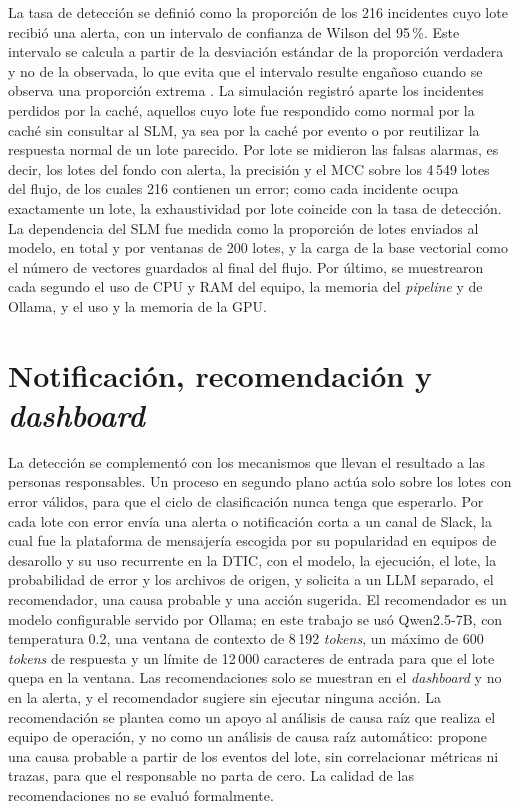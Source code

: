 La tasa de detección se definió como la proporción de los 216 incidentes cuyo lote recibió una alerta, con un intervalo de confianza de Wilson del 95\,\%. Este intervalo se calcula a partir de la desviación estándar de la proporción verdadera y no de la observada, lo que evita que el intervalo resulte engañoso cuando se observa una proporción extrema \cite{wilson1927_probable}. La simulación registró aparte los incidentes perdidos por la caché, aquellos cuyo lote fue respondido como normal por la caché sin consultar al SLM, ya sea por la caché por evento o por reutilizar la respuesta normal de un lote parecido. Por lote se midieron las falsas alarmas, es decir, los lotes del fondo con alerta, la precisión y el MCC sobre los 4\,549 lotes del flujo, de los cuales 216 contienen un error; como cada incidente ocupa exactamente un lote, la exhaustividad por lote coincide con la tasa de detección. La dependencia del SLM fue medida como la proporción de lotes enviados al modelo, en total y por ventanas de 200 lotes, y la carga de la base vectorial como el número de vectores guardados al final del flujo. Por último, se muestrearon cada segundo el uso de CPU y RAM del equipo, la memoria del \textit{pipeline} y de Ollama, y el uso y la memoria de la GPU.

\section{Notificación, recomendación y \textit{dashboard}}\label{sec:met_notificacion}\label{sec:met_dashboard}

La detección se complementó con los mecanismos que llevan el resultado a las personas responsables. Un proceso en segundo plano actúa solo sobre los lotes con error válidos, para que el ciclo de clasificación nunca tenga que esperarlo. Por cada lote con error envía una alerta o notificación corta a un canal de Slack, la cual fue la plataforma de mensajería escogida por su popularidad en equipos de desarollo y su uso recurrente en la DTIC, con el modelo, la ejecución, el lote, la probabilidad de error y los archivos de origen, y solicita a un LLM separado, el recomendador, una causa probable y una acción sugerida. El recomendador es un modelo configurable servido por Ollama; en este trabajo se usó Qwen2.5-7B, con temperatura 0.2, una ventana de contexto de 8\,192 \textit{tokens}, un máximo de 600 \textit{tokens} de respuesta y un límite de 12\,000 caracteres de entrada para que el lote quepa en la ventana. Las recomendaciones solo se muestran en el \textit{dashboard} y no en la alerta, y el recomendador sugiere sin ejecutar ninguna acción. La recomendación se plantea como un apoyo al análisis de causa raíz que realiza el equipo de operación, y no como un análisis de causa raíz automático: propone una causa probable a partir de los eventos del lote, sin correlacionar métricas ni trazas, para que el responsable no parta de cero. La calidad de las recomendaciones no se evaluó formalmente.

